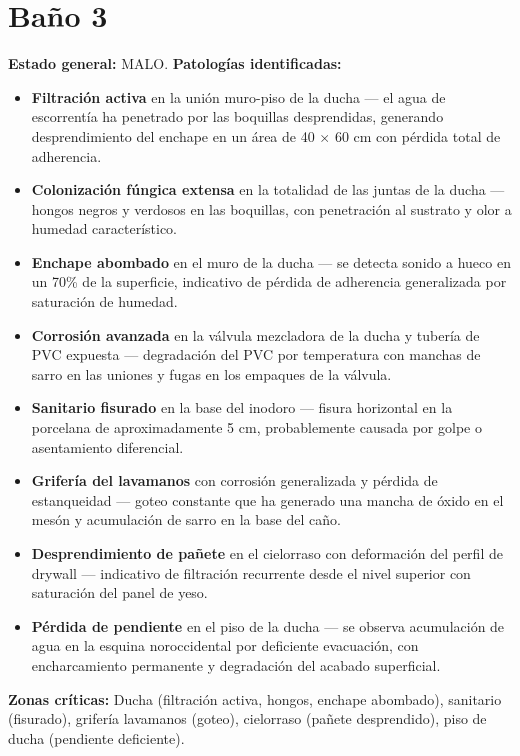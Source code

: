 \documentclass[12pt]{article}
\begin{document}
\section{Baño 3}
\noindent\textbf{Estado general:} MALO.
\medskip
\noindent\textbf{Patologías identificadas:}
\begin{itemize}[leftmargin=*,nosep]
  \item \textbf{Filtración activa} en la unión muro-piso de la ducha — el agua de escorrentía ha penetrado por las boquillas desprendidas, generando desprendimiento del enchape en un área de 40 $\times$ 60 cm con pérdida total de adherencia.
  \item \textbf{Colonización fúngica extensa} en la totalidad de las juntas de la ducha — hongos negros y verdosos en las boquillas, con penetración al sustrato y olor a humedad característico.
  \item \textbf{Enchape abombado} en el muro de la ducha — se detecta sonido a hueco en un 70\% de la superficie, indicativo de pérdida de adherencia generalizada por saturación de humedad.
  \item \textbf{Corrosión avanzada} en la válvula mezcladora de la ducha y tubería de PVC expuesta — degradación del PVC por temperatura con manchas de sarro en las uniones y fugas en los empaques de la válvula.
  \item \textbf{Sanitario fisurado} en la base del inodoro — fisura horizontal en la porcelana de aproximadamente 5 cm, probablemente causada por golpe o asentamiento diferencial.
  \item \textbf{Grifería del lavamanos} con corrosión generalizada y pérdida de estanqueidad — goteo constante que ha generado una mancha de óxido en el mesón y acumulación de sarro en la base del caño.
  \item \textbf{Desprendimiento de pañete} en el cielorraso con deformación del perfil de drywall — indicativo de filtración recurrente desde el nivel superior con saturación del panel de yeso.
  \item \textbf{Pérdida de pendiente} en el piso de la ducha — se observa acumulación de agua en la esquina noroccidental por deficiente evacuación, con encharcamiento permanente y degradación del acabado superficial.
\end{itemize}
\medskip
\noindent\textbf{Zonas críticas:} Ducha (filtración activa, hongos, enchape abombado), sanitario (fisurado), grifería lavamanos (goteo), cielorraso (pañete desprendido), piso de ducha (pendiente deficiente).
\bigskip
\end{document}
